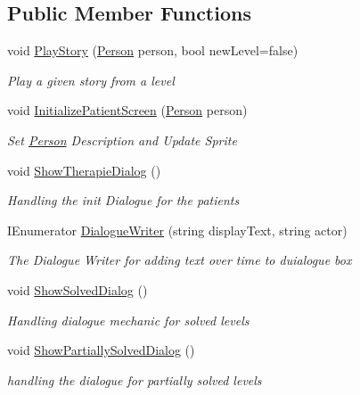 \subsection*{Public Member Functions}
\begin{DoxyCompactItemize}
\item 
void \mbox{\hyperlink{class_dr_evil_1_1_mechanics_1_1_dialog_player_a1d412965461502a4770f7c754f5188f0}{Play\+Story}} (\mbox{\hyperlink{class_person}{Person}} person, bool new\+Level=false)
\begin{DoxyCompactList}\small\item\em Play a given story from a level \end{DoxyCompactList}\item 
void \mbox{\hyperlink{class_dr_evil_1_1_mechanics_1_1_dialog_player_a641a18db7fcbfdbb7c052611c0d4f47d}{Initialize\+Patient\+Screen}} (\mbox{\hyperlink{class_person}{Person}} person)
\begin{DoxyCompactList}\small\item\em Set \mbox{\hyperlink{class_person}{Person}} Description and Update Sprite \end{DoxyCompactList}\item 
void \mbox{\hyperlink{class_dr_evil_1_1_mechanics_1_1_dialog_player_a00c6b192050d5dcde49caf9bd7e124b0}{Show\+Therapie\+Dialog}} ()
\begin{DoxyCompactList}\small\item\em Handling the init Dialogue for the patients \end{DoxyCompactList}\item 
I\+Enumerator \mbox{\hyperlink{class_dr_evil_1_1_mechanics_1_1_dialog_player_acd487680cd0955af518d0db6b2789813}{Dialogue\+Writer}} (string display\+Text, string actor)
\begin{DoxyCompactList}\small\item\em The Dialogue Writer for adding text over time to duialogue box \end{DoxyCompactList}\item 
void \mbox{\hyperlink{class_dr_evil_1_1_mechanics_1_1_dialog_player_ad6012eb1ba848915bfc90a73ca04c6b6}{Show\+Solved\+Dialog}} ()
\begin{DoxyCompactList}\small\item\em Handling dialogue mechanic for solved levels \end{DoxyCompactList}\item 
void \mbox{\hyperlink{class_dr_evil_1_1_mechanics_1_1_dialog_player_a38669bb0c15607e64dca7741052f9c6e}{Show\+Partially\+Solved\+Dialog}} ()
\begin{DoxyCompactList}\small\item\em handling the dialogue for partially solved levels \end{DoxyCompactList}\end{DoxyCompactItemize}
